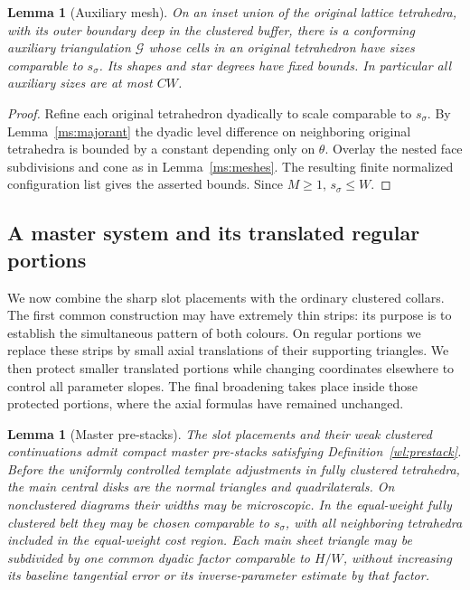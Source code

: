 \documentclass[11pt]{article}
\numberwithin{equation}{section}
\newtheorem{lemma}[theorem]{Lemma}
\theoremstyle{definition}
\theoremstyle{remark}
\begin{document}
\begin{lemma}[Auxiliary mesh]
\label{ms:auxiliary}
On an inset union of the original lattice tetrahedra, with its outer
boundary deep in the clustered buffer, there is a conforming
auxiliary triangulation $\mathcal G$ whose cells in an original
tetrahedron have sizes comparable to $s_\sigma$.  Its shapes and
star degrees have fixed bounds.  In particular all auxiliary sizes
are at most $CW$.
\end{lemma}

\begin{proof}
Refine each original tetrahedron dyadically to scale comparable to
$s_\sigma$.  By Lemma~\ref{ms:majorant} the dyadic level difference on
neighboring original tetrahedra is bounded by a constant depending
only on $\theta$.  Overlay the nested face subdivisions and cone
as in Lemma~\ref{ms:meshes}.  The resulting finite normalized
configuration list gives the asserted bounds.  Since $M\ge1$,
$s_\sigma\le W$.
\end{proof}

\subsection{A master system and its translated regular portions}

We now combine the sharp slot placements with the ordinary clustered
collars.  The first common construction may have extremely thin strips:
its purpose is to establish the simultaneous pattern of both colours.
On regular portions we replace these strips by small axial translations
of their supporting triangles.  We then protect smaller translated
portions while changing coordinates elsewhere to control all parameter
slopes.  The final broadening takes place inside those protected
portions, where the axial formulas have remained unchanged.

\begin{lemma}[Master pre-stacks]
\label{ms:master}
The slot placements and their weak clustered continuations admit
compact master pre-stacks satisfying Definition~\ref{wl:prestack}.  Before the
uniformly controlled template adjustments in fully clustered tetrahedra,
the main central disks are the normal triangles and quadrilaterals.  On
nonclustered diagrams their widths may be microscopic.  In the
equal-weight fully clustered belt they may be chosen comparable to
$s_\sigma$, with all neighboring tetrahedra included in the
equal-weight cost region.  Each main sheet triangle may be
subdivided by one common dyadic factor comparable to $H/W$, without
increasing its baseline tangential error or its inverse-parameter
estimate by that factor.
\end{lemma}
\end{document}
